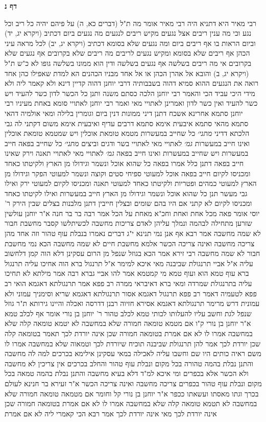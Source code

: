 \documentclass[12pt, openany]{book}
\newcommand{\sethebfont}{
\fontsize{10.5pt}{21.0pt} \selectfont
}
\newcommand{\twocol}[1]{
	{\sethebfont \begin{multicols}{2}
			#1
	\end{multicols}}	
}
\newcommand{\sectname}{}
\newcommand{\newsection}[1]{
	\addcontentsline{toc}{section}{#1}
	\renewcommand{\sectname}{#1}	
	\vspace{-\baselineskip}
	\begin{center}
		\textbf{%
\fontsize{16pt}{16pt}\selectfont
			#1}
	\end{center}
	\vspace{-\baselineskip}
	\nopagebreak
}
\begin{document}
\newsection{דף נ}
\twocol{רבי מאיר היא  דתניא היה רבי מאיר אומר  מה ת"ל (דברים כא, ה) על פיהם יהיה כל ריב וכל נגע וכי מה ענין ריבים אצל נגעים  מקיש ריבים לנגעים  מה נגעים ביום דכתיב (ויקרא יג, יד) וביום הראות בו אף ריבים ביום 
ומה נגעים שלא בסומא דכתיב (ויקרא יג, יב) לכל מראה עיני הכהן אף ריבים שלא בסומא  ומקיש נגעים לריבים מה ריבים שלא בקרובים אף נגעים שלא בקרובים 
אי מה ריבים בשלשה אף נגעים בשלשה  ודין הוא ממונו בשלשה גופו לא כ"ש  ת"ל (ויקרא יג, ב) והובא אל אהרן הכהן או אל אחד מבניו הכהנים הא למדת שאפילו כהן אחד רואה את הנגעים 
ההוא סמיא דהוה בשבבותיה דרבי יוחנן דהוה קדיין דינא ולא קאמר ליה ולא מידי  היכי עביד הכי  והאמר רבי יוחנן  הלכה כסתם משנה
ותנן  כל הכשר לדון כשר להעיד ויש כשר להעיד ואין כשר לדון  ואמרינן  לאתויי מאי  ואמר רבי יוחנן  לאתויי סומא באחת מעיניו 
רבי יוחנן סתמא אחרינא אשכח דתנן  דיני ממונות דנין ביום וגומרין בלילה 
ומאי אולמיה דהאי סתמא מהאי סתמא  איבעית אימא  סתמא דרבים עדיף ואיבעית אימא  משום דקתני לה גבי הלכתא דדיני
{\large\emph{מתני׳}} כל שחייב במעשרות מטמא טומאת אוכלין ויש שמטמא טומאת אוכלין ואינו חייב במעשרות
{\large\emph{גמ׳}} לאתויי מאי לאתויי בשר ודגים וביצים
{\large\emph{מתני׳}} כל שחייב בפאה חייב במעשרות ויש שחייב במעשרות ואינו חייב בפאה
{\large\emph{גמ׳}} לאתויי מאי לאתויי תאנה וירק שאינו חייב בפאה  דתנן כלל אמרו בפאה  כל שהוא אוכל ונשמר וגידולו מן הארץ ולקיטתו כאחד ומכניסו לקיום חייב בפאה 
אוכל למעוטי ספיחי סטים וקוצה ונשמר למעוטי הפקר וגידולו מן הארץ למעוטי כמהים ופטריות ולקיטתו כאחד למעוטי תאנה ומכניסו לקיום למעוטי ירק 
ואילו גבי מעשר תנן  כל שהוא אוכל ונשמר וגידולו מן הארץ חייב במעשרות ואילו לקיטתו כאחד ומכניסו לקיום לא קתני 
אם היו בהם שומים ובצלין חייבין דתנן מלבנות בצלים שבין הירק ר' יוסי אומר  פאה מכל אחת ואחת וחכ"א  מאחת על הכל 
אמר רבה בר בר חנה א"ר יוחנן  עולשין שזרען מתחילה לבהמה ונמלך עליהן לאדם
צריכות מחשבה לכשיתלשו  קסבר  מחשבת חבור לא שמה מחשבה 
אמר רבא  אף אנן נמי תנינא י"ג דברים נאמרו בנבלת עוף טהור וזה אחד מהן צריכה מחשבה ואינה צריכה הכשר  אלמא  מחשבת חיים לא שמה מחשבה הכא נמי מחשבת חבור לא שמה מחשבה 
רבי זירא אמר  הכא בגוזל שנפל מן הרום עסקינן דלא הוה קמן דלחשוב עליה 
א"ל אביי  תרנגולת שביבנה מאי איכא למימר  א"ל  תרנגול ברא הוה 
אחיכו עליה  תרנגול ברא עוף טמא הוא ועוף טמא מי קמטמא  אמר להו אביי  גברא רבה אמר מילתא לא תחיכו עליה בתרנגולת שמרדה ומאי ברא דאיבראי ממרה 
רב פפא אמר  תרנגולתא דאגמא הואי  רב פפא לטעמיה דאמר רב פפא  תרנגול דאגמא אסור תרנגולתא דאגמא שריא
וסימניך עמוני ולא עמונית  דרש מרימר  תרנגולתא דאגמא אסירא  חזיוה רבנן דדרסה ואכלה והיינו גירותא 
ת"ר גוזל שנפל לגת וחשב עליו להעלותו לכותי טמא לכלב טהור  ר' יוחנן בן נורי אומר  אף לכלב טמא 
א"ר יוחנן בן נורי  ק"ו אם מטמא טומאה חמורה שלא במחשבה לא יטמא טומאה קלה שלא במחשבה 
אמרו לו  לא אם אמרת בטומאה חמורה שכן אינה יורדת לכך תאמר בטומאה קלה שכן יורדת לכך 
אמר להן  תרנגולת שביבנה תוכיח שיורדת לכך וטמאוה שלא במחשבה  אמרו לו  משם ראיה  כותים היו שם וחשבו עליה לאכילה 
במאי עסקינן  אילימא בכרכים למה לה מחשבה  והתנן  נבלת בהמה טהורה בכל מקום ונבלת עוף טהור והחלב בכרכים אין צריכין לא מחשבה ולא הכשר 
אלא בכפרים ומי איכא למ"ד דלא בעיא מחשבה  והתנן  נבלת בהמה טמאה בכל מקום ונבלת עוף טהור בכפרים צריכה מחשבה ואינה צריכה הכשר 
א"ר זעירא בר חנינא  לעולם בכרך וגתו מאסתו ועשאתו ככפר 
א"ר יוחנן בן נורי  קל וחומר אם מטמאה טומאה חמורה שלא במחשבה לא תטמא טומאה קלה שלא במחשבה 
אמרו לו  לא אם אמרת בטומאה חמורה שכן אינה יורדת לכך 
מאי אינה יורדת לכך  אמר רבא הכי קאמרי ליה  לא אם אמרת}
\end{document}
